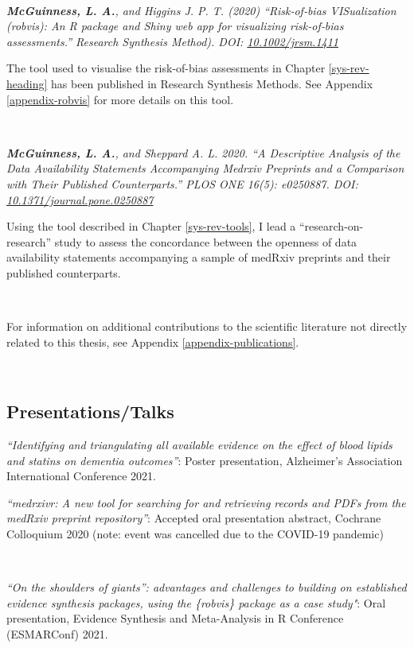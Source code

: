 \documentclass[a4paper, twoside]{templates/ociamthesis}
\begin{document}
~

\emph{\textbf{McGuinness, L. A.}, and Higgins J. P. T. (2020) ``Risk‐of‐bias VISualization (robvis): An R package and Shiny web app for visualizing risk‐of‐bias assessments.'' Research Synthesis Method). DOI: \href{https://doi.org/10.1002/jrsm.1411}{10.1002/jrsm.1411}}

The tool used to visualise the risk-of-bias assessments in Chapter \ref{sys-rev-heading} has been published in Research Synthesis Methods. See Appendix \ref{appendix-robvis} for more details on this tool.

~

\emph{\textbf{McGuinness, L. A.}, and Sheppard A. L. 2020. ``A Descriptive Analysis of the Data Availability Statements Accompanying Medrxiv Preprints and a Comparison with Their Published Counterparts.'' PLOS ONE 16(5): e0250887. DOI: \href{https://doi.org/10.1371/journal.pone.0250887}{10.1371/journal.pone.0250887}}

Using the tool described in Chapter \ref{sys-rev-tools}, I lead a ``research-on-research'' study to assess the concordance between the openness of data availability statements accompanying a sample of medRxiv preprints and their published counterparts.

~

For information on additional contributions to the scientific literature not directly related to this thesis, see Appendix \ref{appendix-publications}.

~

\hypertarget{presentationstalks}{%
\subsection{Presentations/Talks}\label{presentationstalks}}

\emph{``Identifying and triangulating all available evidence on the effect of blood lipids and statins on dementia outcomes''}: Poster presentation, Alzheimer's Association International Conference 2021.
~

\emph{``medrxivr: A new tool for searching for and retrieving records and PDFs from the medRxiv preprint repository''}: Accepted oral presentation abstract, Cochrane Colloquium 2020 (note: event was cancelled due to the COVID-19 pandemic)

~

\emph{``On the shoulders of giants'': advantages and challenges to building on established evidence synthesis packages, using the \{robvis\} package as a case study"}: Oral presentation, Evidence Synthesis and Meta-Analysis in R Conference (ESMARConf) 2021.
\end{document}
